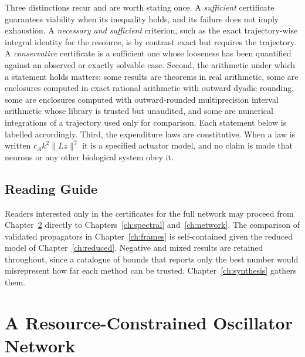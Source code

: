 \documentclass[11pt,notitlepage]{report}
\theoremstyle{definition}
\theoremstyle{remark}
\begin{document}
Three distinctions recur and are worth stating once. A \emph{sufficient} certificate guarantees viability when its inequality holds, and its failure does not imply exhaustion. A \emph{necessary and sufficient} criterion, such as the exact trajectory-wise integral identity for the resource, is by contrast exact but requires the trajectory. A \emph{conservative} certificate is a sufficient one whose looseness has been quantified against an observed or exactly solvable case. Second, the arithmetic under which a statement holds matters: some results are theorems in real arithmetic, some are enclosures computed in exact rational arithmetic with outward dyadic rounding, some are enclosures computed with outward-rounded multiprecision interval arithmetic whose library is trusted but unaudited, and some are numerical integrations of a trajectory used only for comparison. Each statement below is labelled accordingly. Third, the expenditure laws are constitutive. When a law is written $c_Ak^2\|Lz\|^2$ it is a specified actuator model, and no claim is made that neurons or any other biological system obey it.

\section{Reading Guide}
Readers interested only in the certificates for the full network may proceed from Chapter~\ref{ch:model} directly to Chapters~\ref{ch:spectral} and~\ref{ch:network}. The comparison of validated propagators in Chapter~\ref{ch:frames} is self-contained given the reduced model of Chapter~\ref{ch:reduced}. Negative and mixed results are retained throughout, since a catalogue of bounds that reports only the best number would misrepresent how far each method can be trusted. Chapter~\ref{ch:synthesis} gathers them.
\chapter{A Resource-Constrained Oscillator Network}\label{ch:model}
\end{document}
